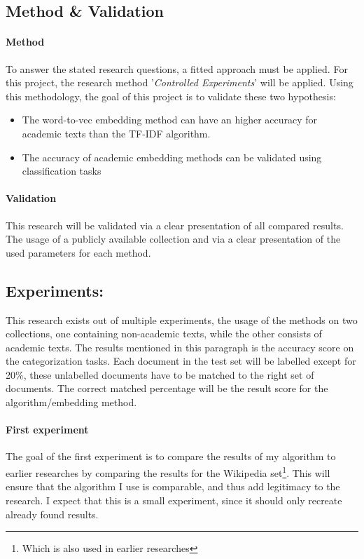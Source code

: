 \documentclass[10pt,a4paper]{article}
\begin{document}
\subsection{Method \& Validation}
\paragraph{Method} To answer the stated research questions, a fitted approach must be applied. For this project, the research method '\textit{Controlled Experiments}' will be applied. Using this methodology, the goal of this project is to validate these two hypothesis:
\begin{itemize}
\item{The word-to-vec embedding method can have an higher accuracy for academic texts than the TF-IDF algorithm.}
\item{The accuracy of academic embedding methods can be validated using classification tasks}
\end{itemize}
\paragraph{Validation} This research will be validated via a clear presentation of all compared results. The usage of a publicly available collection and via a clear presentation of the used parameters for each method.

\subsection{Experiments:}
This research exists out of multiple experiments, the usage of the methods on two collections, one containing non-academic texts, while the other consists of academic texts. The results mentioned in this paragraph is the accuracy score on the categorization tasks. Each document in the test set will be labelled except for 20\%, these unlabelled documents have to be matched to the right set of documents. The correct matched percentage will be the result score for the algorithm/embedding method.\\
\paragraph{First experiment}The goal of the first experiment is to compare the results of my algorithm to earlier researches by comparing the results for the Wikipedia set\footnote{Which is also used in earlier researches}. This will ensure that the algorithm I use is comparable, and thus add legitimacy to the research. I expect that this is a small experiment, since it should only recreate already found results.\\
\end{document}
